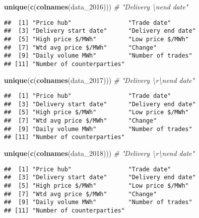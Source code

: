 \documentclass[
]{article}
\newenvironment{Shaded}{\begin{snugshade}}{\end{snugshade}}
\newcommand{\CommentTok}[1]{\textcolor[rgb]{0.56,0.35,0.01}{\textit{#1}}}
\newcommand{\FunctionTok}[1]{\textcolor[rgb]{0.13,0.29,0.53}{\textbf{#1}}}
\newcommand{\NormalTok}[1]{#1}
\begin{document}
\begin{Shaded}
\begin{Highlighting}[]
\FunctionTok{unique}\NormalTok{(}\FunctionTok{c}\NormalTok{(}\FunctionTok{colnames}\NormalTok{(data\_2016))) }\CommentTok{\# "Delivery \textbackslash{}nend date"}
\end{Highlighting}
\end{Shaded}

\begin{verbatim}
##  [1] "Price hub"                "Trade date"              
##  [3] "Delivery start date"      "Delivery end date"       
##  [5] "High price $/MWh"         "Low price $/MWh"         
##  [7] "Wtd avg price $/MWh"      "Change"                  
##  [9] "Daily volume MWh"         "Number of trades"        
## [11] "Number of counterparties"
\end{verbatim}

\begin{Shaded}
\begin{Highlighting}[]
\FunctionTok{unique}\NormalTok{(}\FunctionTok{c}\NormalTok{(}\FunctionTok{colnames}\NormalTok{(data\_2017))) }\CommentTok{\# "Delivery \textbackslash{}r\textbackslash{}nend date"}
\end{Highlighting}
\end{Shaded}

\begin{verbatim}
##  [1] "Price hub"                "Trade date"              
##  [3] "Delivery start date"      "Delivery end date"       
##  [5] "High price $/MWh"         "Low price $/MWh"         
##  [7] "Wtd avg price $/MWh"      "Change"                  
##  [9] "Daily volume MWh"         "Number of trades"        
## [11] "Number of counterparties"
\end{verbatim}

\begin{Shaded}
\begin{Highlighting}[]
\FunctionTok{unique}\NormalTok{(}\FunctionTok{c}\NormalTok{(}\FunctionTok{colnames}\NormalTok{(data\_2018))) }\CommentTok{\# "Delivery \textbackslash{}r\textbackslash{}nend date"}
\end{Highlighting}
\end{Shaded}

\begin{verbatim}
##  [1] "Price hub"                "Trade date"              
##  [3] "Delivery start date"      "Delivery end date"       
##  [5] "High price $/MWh"         "Low price $/MWh"         
##  [7] "Wtd avg price $/MWh"      "Change"                  
##  [9] "Daily volume MWh"         "Number of trades"        
## [11] "Number of counterparties"
\end{verbatim}
\end{document}
